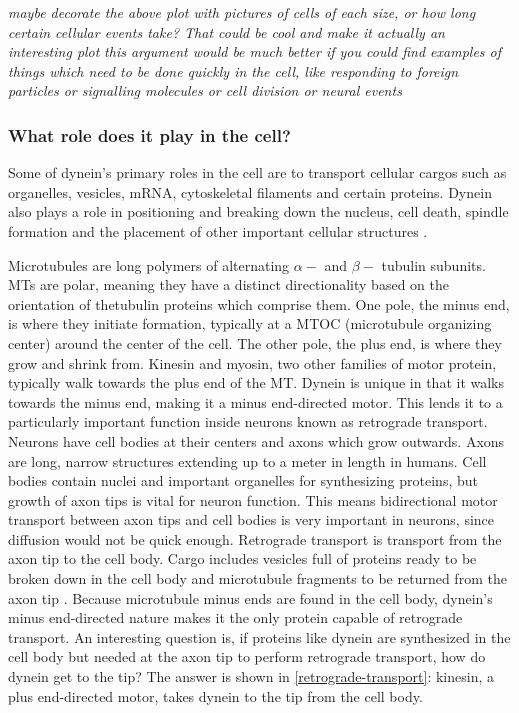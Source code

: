 \documentclass[10pt]{article} %
\begin{document}
\textit{maybe decorate the above plot with pictures of cells of each size, or how long certain cellular events take? That could be cool and make it actually an interesting plot}
\textit{this argument would be much better if you could find examples of things which need to be done quickly in the cell, like responding to foreign particles or signalling
  molecules or cell division or neural events}

\subsubsection{What role does it play in the cell?}
Some of dynein's primary roles in the cell are to transport cellular cargos such as organelles, vesicles, mRNA, cytoskeletal filaments and certain proteins. Dynein also plays a role in positioning and breaking down the nucleus, cell death, spindle formation and the placement of other important cellular structures \cite{valetoolbox}.

Microtubules are long polymers of alternating $\alpha-$ and $\beta-$ tubulin subunits. MTs are polar, meaning they have a distinct directionality based on the orientation of thetubulin proteins which comprise them. One pole, the minus end, is where they initiate formation, typically at a MTOC (microtubule organizing center) around the center of the cell. The other pole, the plus end, is where they grow and shrink from. Kinesin and myosin, two other families of motor protein, typically walk towards the plus end of the MT. Dynein is unique in that it walks towards the minus end, making it a minus end-directed motor. This lends it to a particularly important function inside neurons known as retrograde transport.\\

Neurons have cell bodies at their centers and axons which grow outwards. Axons are long, narrow structures extending up to a meter in length in humans. Cell bodies contain nuclei and important organelles for synthesizing proteins, but growth of axon tips is vital for neuron function. This means bidirectional motor transport between axon tips and cell bodies is very important in neurons, since diffusion would not be quick enough. Retrograde transport is transport from the axon tip to the cell body. Cargo includes vesicles full of proteins ready to be broken down in the cell body and microtubule fragments to be returned from the axon tip \cite{neuroanatomy}. Because microtubule minus ends are found in the cell body, dynein's minus end-directed nature makes it the only protein capable of retrograde transport. An interesting question is, if proteins like dynein are synthesized in the cell body but needed at the axon tip to perform retrograde transport, how do dynein get to the tip? The answer is shown in \ref{retrograde-transport}: kinesin, a plus end-directed motor, takes dynein to the tip from the cell body.\\
\end{document}
